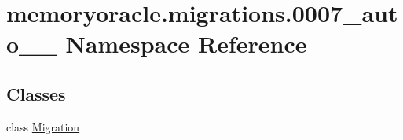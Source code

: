 \hypertarget{namespacememoryoracle_1_1migrations_1_10007__auto__20150403__0248}{}\section{memoryoracle.\+migrations.0007\+\_\+auto\+\_\+\_ Namespace Reference}
\label{namespacememoryoracle_1_1migrations_1_10007__auto__20150403__0248}
\subsection*{Classes}
\begin{DoxyCompactItemize}
\item 
class \hyperlink{classmemoryoracle_1_1migrations_1_10007__auto__20150403__0248_1_1Migration}{Migration}
\end{DoxyCompactItemize}
